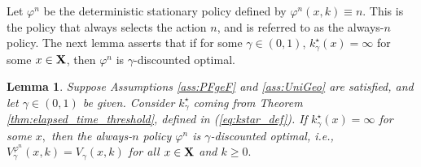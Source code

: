 \documentclass[letterpaper,10pt,conference]{ieeeconf}  %
\newtheorem{lemma}{Lemma}
\begin{document}
Let $\varphi^n$ be the deterministic stationary policy defined by $\varphi^n(x,k)\equiv n$. This is the policy that always selects the action $n$, and is referred to as the always-$n$ policy.   The next lemma asserts that if for some $\gamma\in(0,1)$, $k_\gamma^\star(x)=\infty$ for some $x\in {\bf X}$, then $\varphi^n$ is $\gamma$-discounted optimal. 
\medskip
\begin{lemma}\label{Kostia2026Lem01}
Suppose Assumptions \ref{ass:PFgeF} and \ref{ass:UniGeo} are satisfied, and let $\gamma\in (0,1)$ be given. Consider $k_\gamma^\star$ coming from Theorem \ref{thm:elapsed_time_threshold}, defined in (\ref{eq:kstar_def}).  If $k^\star_\gamma(x)=\infty$ for some $x,$ then the always-$n$ policy $\varphi^n$ is $\gamma$-discounted optimal, i.e., $V_\gamma^{\varphi^n}(x,k)=V_\gamma(x,k)$ for all $x\in {\bf X}$ and $k\ge 0.$
\end{lemma}
\medskip
\end{document}

